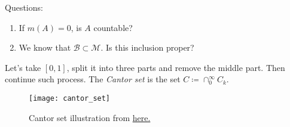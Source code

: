 Questions:
\begin{enumerate}
    \item {
        If $m(A) = 0$, is $A$ countable?
    }
    \item {
        We know that $\mathcal{B} \subset \mathcal{M}$. Is this inclusion proper?
    }
\end{enumerate}

\begin{definition}
    Let's take $[0, 1]$, split it into three parts and remove the middle part.
    Then continue such process.
    The \textit{Cantor set} is the set $C \coloneqq \cap_0^\infty C_k$.
\end{definition}

\begin{figure*}[h]
    \centering
    \texttt{[image: cantor\_set]}
    \caption*{Cantor set illustration from \href{http://tasks.illustrativemathematics.org/content-standards/tasks/929}{here.}}
\end{figure*}
